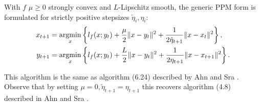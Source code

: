 \documentclass[12pt]{article}
\begin{document}
            \begin{definition}\label{def:agg_ppm}
                With $f$ $\mu \ge 0$ strongly convex and $L$-Lipschitz smooth, the generic PPM form is formulated for strictly positive stepsizes $\tilde \eta_i,\eta_i$: 
                \begin{align*}
                    x_{t + 1} &= \mathop{\rm argmin}\limits_{x} \left\lbrace
                        l_f(x; y_t) 
                        + 
                        \frac{\mu}{2}\Vert x - y_t\Vert^2
                        + 
                        \frac{1}{2\tilde \eta_{t + 1}} \Vert x - x_t\Vert^2
                    \right\rbrace, 
                    \\
                    y_{t + 1} &= \mathop{\rm argmin}\limits_{x} 
                    \left\lbrace
                        l_f(x; y_t) + \frac{L}{2}\Vert x - y_t\Vert^2 + 
                        \frac{1}{2\eta_{t + 1}}\Vert x - x_{t + 1}\Vert^2
                    \right\rbrace. 
                \end{align*}
            \end{definition}
            \begin{remark}
                This algorithm is the same as algorithm (6.24) described by Ahn and Sra \cite{ahn_understanding_2022}. 
                Observe that by setting $\mu = 0, \tilde \eta_{t + 1} = \eta_{t + 1}$ this recovers algorithm (4.8) described in Ahn and Sra \cite{ahn_understanding_2022}. 
            \end{remark}

            \begin{definition}
                
            \end{definition}
\end{document}
